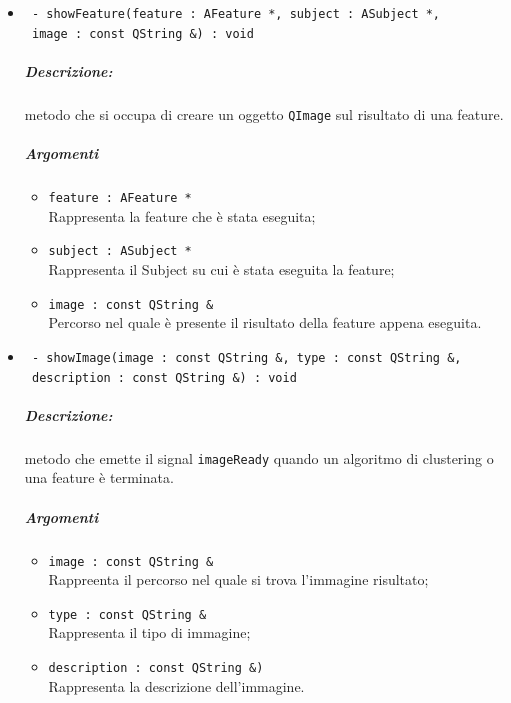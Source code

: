 \begin{itemize}
	\item \color{blue}\verb! - showFeature(feature : AFeature *, subject : ASubject *,!\\
						       \verb! image : const QString &) : void!\\
			 \color{black}\subparagraph{Descrizione:} metodo che si occupa di creare un oggetto \verb!QImage! sul risultato di una feature\g{}.
			 \subparagraph{Argomenti}
			 	\begin{itemize}
				 	\item \color{RoyalPurple}\verb!feature : AFeature *!\\
				 	\color{black}Rappresenta la feature\g{} che è stata eseguita;
				 	
				 	\item \color{RoyalPurple}\verb!subject : ASubject *!\\
				 	\color{black}Rappresenta il Subject\g{} su cui è stata eseguita la feature\g{};
				 	
				 	\item \color{RoyalPurple}\verb!image : const QString &!\\
				 	\color{black}Percorso nel quale è presente il risultato della feature\g{} appena eseguita.
			 	\end{itemize}
	
	\item \color{blue}\verb! - showImage(image : const QString &, type : const QString &,!\\
								\verb! description : const QString &) : void!\\
	\color{black}\subparagraph{Descrizione:}  metodo che emette il signal\g{} \verb!imageReady! quando un algoritmo di clustering\g{} o una feature\g{} è terminata.
	\subparagraph{Argomenti}
		\begin{itemize}
			\item \color{RoyalPurple}\verb!image : const QString &!\\
			\color{black}Rappreenta il percorso nel quale si trova l'immagine risultato;
			
			\item \color{RoyalPurple}\verb!type : const QString &!\\
			\color{black}Rappresenta il tipo di immagine;
			
			\item \color{RoyalPurple}\verb!description : const QString &)!\\
			\color{black}Rappresenta la descrizione dell'immagine.
		\end{itemize}
		

\end{itemize}
